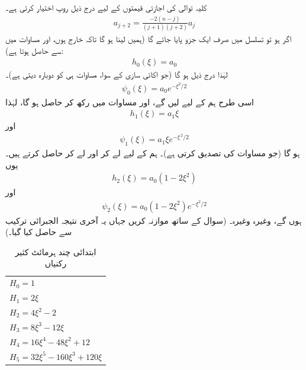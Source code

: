  کلیہ توالی  کی اجازتی قیمتوں کے لیے درج ذیل روپ اختیار کرتی ہے۔
\begin{align}\label{مساوات_شروڈنگر_کلیہ_توالی_اجازتی_الف}
a_{j+2}=\frac{-2(n-j)}{(j+1)(j+2)}a_{j}
\end{align}
اگر  ہو تو تسلسل میں صرف  ایک جزو پایا جائے گا (ہمیں  لینا ہو گا تاکہ    خارج ہوں، اور مساوات  میں  سے  حاصل ہوتا ہے):
\begin{align*}
h_{0}(\xi)=a_{0}
\end{align*}
لہٰذا درج ذیل ہو گا (جو  اکائی سازی کے سوا، مساوات  ہی کو  دوبارہ دیتی ہے)۔
\begin{align*}
\psi_{0}(\xi)=a_{0}e^{-\xi^{2}/2}
\end{align*}
 اسی طرح ہم  کے لیے    لیں گے، اور مساوات  میں   رکھ  کر  حاصل ہو گا، لہٰذا 
\begin{align*}
h_{1}(\xi)=a_{1} \xi
\end{align*}
اور
\begin{align*}
\psi_{1}(\xi)=a_{1}\xi e^{-\xi^{\,2}/2}
\end{align*}
ہو گا (جو مساوات  کی تصدیق کرتی ہے)۔ ہم  کے لیے  لے کر  اور  لے کر  حاصل کرتے ہیں۔ یوں
\begin{align*}
h_{2}(\xi)=a_{0}(1-2\xi^{2})
\end{align*}
اور
\begin{align*}
\psi_{2}(\xi)=a_{0}(1-2\xi^{2})e^{-\xi^{2}/2}
\end{align*}
ہوں گے، وغیرہ وغیرہ۔ (سوال  کے ساتھ موازنہ کریں جہاں یہ آخری نتیجہ الجبرائی ترکیب سے حاصل کیا گیا۔) 
\begin{table}
\caption{ابتدائی چند ہرمائٹ کثیر رکنیاں }
\label{جدول_شروڈنگر_ہرمشی_کثیر_رکنیاں}
\centering
\begin{tabular}{l}
$H_0=1$\\
$H_1=2\xi$\\
$H_2=4\xi^2-2$\\
$H_3=8\xi^3-12\xi$\\
$H_4=16\xi^4-48\xi^2+12$\\
$H_5=32\xi^5-160\xi^3+120\xi$
\end{tabular}
\end{table}
